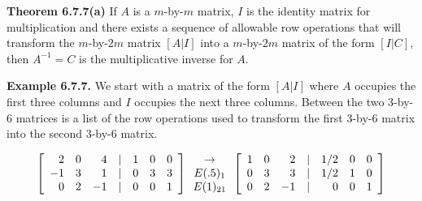 \textbf{Theorem 6.7.7(a)}  If $A$ is a $m$-by-$m$ matrix, $I$ is the identity matrix for multiplication and there exists a sequence of allowable row operations that will transform the $m$-by-$2m$ matrix $[A | I]$ into a $m$-by-$2m$ matrix of the form $[I | C],$ then $A^{-1} = C$ is the multiplicative inverse for $A$.\nl

\textbf{Example 6.7.7.}  We start with a matrix of the form $[A | I]$ where $A$ occupies the first three columns and $I$ occupies the next three columns.  Between the two 3-by-6 matrices is a list of the row operations used to transform the first 3-by-6 matrix into the second 3-by-6 matrix.\nl


\begin{equation*}
\left[\begin{array}{rrrcrrr}
2&0&4&|&1&0&0\\
-1&3&1&|&0&3&3\\
0&2&-1&|&0&0&1\\
\end{array}
\right]
\begin{array}{c}
\to\\
E(.5)_{1}\\
E(1)_{21}\\
\end{array}
\left[
\begin{array}{rrrcrrr}
1&0&2&|&1/2&0&0\\
0&3&3&|&1/2&1&0\\
0&2&-1&|&0&0&1
\end{array}
\right]
\end{equation*}\nl










